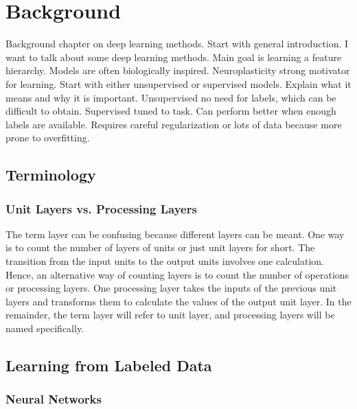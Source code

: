 \chapter{Background}

Background chapter on deep learning methods. Start with general introduction. I
want to talk about some deep learning methods. Main goal is learning a feature
hierarchy. Models are often biologically inspired. Neuroplasticity strong
motivator for learning. Start with either unsupervised or supervised models.
Explain what it means and why it is important. Unsupervised no need for labels,
which can be difficult to obtain. Supervised tuned to task. Can perform better
when enough labels are available. Requires careful regularization or lots of
data because more prone to overfitting.



\section{Terminology}

\subsection{Unit Layers vs. Processing Layers}

The term layer can be confusing because different layers can be meant. One way
is to count the number of layers of units or just unit layers for short. The
transition from the input units to the output units involves one calculation.
Hence, an alternative way of counting layers is to count the number of
operations or processing layers. One processing layer takes the inputs of the
previous unit layers and transforms them to calculate the values of the output
unit layer. In the remainder, the term layer will refer to unit layer, and
processing layers will be named specifically.

\section{Learning from Labeled Data}


\subsection{Neural Networks}

